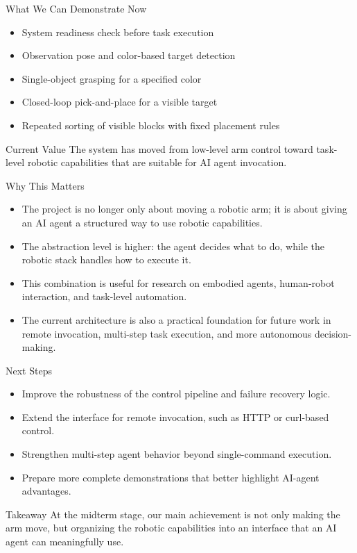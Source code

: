 \documentclass[aspectratio=169]{beamer}
\begin{document}
\begin{frame}{What We Can Demonstrate Now}
  \begin{itemize}
    \item System readiness check before task execution
    \item Observation pose and color-based target detection
    \item Single-object grasping for a specified color
    \item Closed-loop pick-and-place for a visible target
    \item Repeated sorting of visible blocks with fixed placement rules
  \end{itemize}

  \vspace{0.5em}

  \begin{block}{Current Value}
    The system has moved from low-level arm control toward task-level robotic capabilities that are suitable for AI agent invocation.
  \end{block}
\end{frame}

\begin{frame}{Why This Matters}
  \begin{itemize}
    \item The project is no longer only about moving a robotic arm; it is about giving an AI agent a structured way to use robotic capabilities.
    \item The abstraction level is higher: the agent decides what to do, while the robotic stack handles how to execute it.
    \item This combination is useful for research on embodied agents, human-robot interaction, and task-level automation.
    \item The current architecture is also a practical foundation for future work in remote invocation, multi-step task execution, and more autonomous decision-making.
  \end{itemize}
\end{frame}

\begin{frame}{Next Steps}
  \begin{itemize}
    \item Improve the robustness of the control pipeline and failure recovery logic.
    \item Extend the interface for remote invocation, such as HTTP or curl-based control.
    \item Strengthen multi-step agent behavior beyond single-command execution.
    \item Prepare more complete demonstrations that better highlight AI-agent advantages.
  \end{itemize}

  \vspace{0.5em}

  \begin{block}{Takeaway}
    At the midterm stage, our main achievement is not only making the arm move, but organizing the robotic capabilities into an interface that an AI agent can meaningfully use.
  \end{block}
\end{frame}
\end{document}
